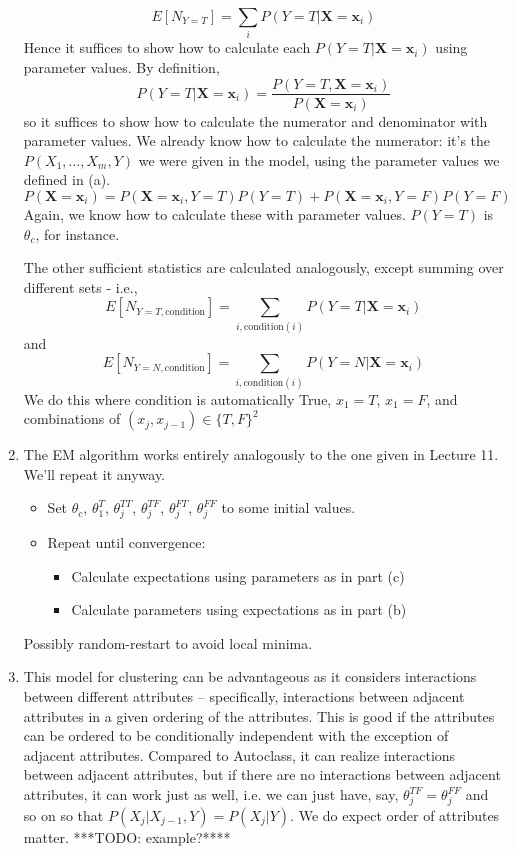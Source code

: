 \documentclass{article}
\begin{document}
\begin{enumerate}
$$E[N_{Y=T}]=\sum_i P(Y=T|\mathbf X = \mathbf x_i)$$
Hence it suffices to show how to calculate each $P(Y=T|\mathbf X=\mathbf x_i)$
using parameter values. 
By definition,
$$P(Y=T|\mathbf X = \mathbf x_i)=\frac{P(Y=T, \mathbf X = \mathbf x_i)}{P(\mathbf X = \mathbf x_i)}$$
so it suffices to show how to calculate the numerator and denominator with
parameter values. We already know how to calculate the numerator: it's the 
$P(X_1,\ldots,X_m,Y)$ we were given in the model, using the parameter values
we defined in (a). 
$$P(\mathbf X = \mathbf x_i)=P(\mathbf X = \mathbf x_i, Y=T)P(Y=T)+P(\mathbf X = \mathbf x_i, Y=F)P(Y=F)$$
Again, we know how to calculate these with parameter values. $P(Y=T)$ is 
$\theta_c$, for instance.

The other sufficient statistics are calculated analogously, except summing
over different sets - i.e., 
$$E[N_{Y=T,\mathrm{condition}}]=\sum_{i, \mathrm{condition}(i)} P(Y=T|\mathbf X=\mathbf x_i)$$
and
$$E[N_{Y=N,\mathrm{condition}}]=\sum_{i, \mathrm{condition}(i)} P(Y=N|\mathbf X=\mathbf x_i)$$
We do this where condition is automatically True, $x_1=T$, $x_1=F$, and 
combinations of $(x_j,x_{j-1})\in \{T,F\}^2$

\item The EM algorithm works entirely analogously to the one given in Lecture 
  11. We'll repeat it anyway.
  \begin{itemize}
  \item Set $\theta_c$, $\theta^T_1$, $\theta^{TT}_j$, $\theta^{TF}_j$, 
    $\theta^{FT}_j$, $\theta^{FF}_j$ to some initial values.
  \item Repeat until convergence:
    \begin{itemize}
    \item Calculate expectations using parameters as in part (c)
    \item Calculate parameters using expectations as in part (b)
    \end{itemize}
  \end{itemize}
  Possibly random-restart to avoid local minima.

\item This model for clustering can be advantageous as it considers interactions
  between different attributes -- specifically, interactions between adjacent
  attributes in a given ordering of the attributes. This is good if the 
  attributes can be ordered to be conditionally independent with the exception 
  of adjacent attributes. Compared to Autoclass, it can realize interactions
  between adjacent attributes, but if there are no interactions between adjacent
  attributes, it can work just as well, i.e. we can just have, say, 
  $\theta_j^{TF}=\theta_j^{FF}$ and so on so that $P(X_j|X_{j-1},Y)=P(X_j|Y)$. 
  We do expect order of attributes matter. ***TODO: example?****
\end{enumerate}
\end{document}
